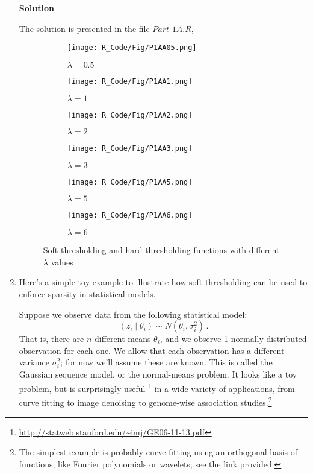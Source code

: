\documentclass[11 pt]{article}
\begin{document}
\begin{enumerate}[label=(\Alph*)]
\vspace{2mm}
\textbf{Solution}

The solution is presented in the file $Part\_1A.R$,



\begin{figure}[H]
	\begin{center}
		\begin{subfigure}[h]{0.4\linewidth}
			\texttt{[image: R\_Code/Fig/P1AA05.png]}
			\caption{$\lambda=0.5$}
		\end{subfigure}
		\begin{subfigure}[h]{0.4\linewidth}
			\texttt{[image: R\_Code/Fig/P1AA1.png]}
			\caption{$\lambda=1$}
		\end{subfigure}
		\begin{subfigure}[h]{0.4\linewidth}
			\texttt{[image: R\_Code/Fig/P1AA2.png]}
			\caption{$\lambda=2$}
		\end{subfigure}
		\begin{subfigure}[h]{0.4\linewidth}
			\texttt{[image: R\_Code/Fig/P1AA3.png]}
			\caption{$\lambda=3$}
		\end{subfigure}
		\begin{subfigure}[h]{0.4\linewidth}
			\texttt{[image: R\_Code/Fig/P1AA5.png]}
			\caption{$\lambda=5$}
		\end{subfigure}
		\begin{subfigure}[h]{0.4\linewidth}
			\texttt{[image: R\_Code/Fig/P1AA6.png]}
			\caption{$\lambda=6$}
		\end{subfigure}
		\caption{Soft-thresholding and hard-thresholding functions with different  $\lambda$ values}
		\label{fig:Fig1}
	\end{center}
\end{figure}



\newpage
\item Here's a simple toy example to illustrate how soft thresholding can be used to enforce sparsity in statistical models.

Suppose we observe data from the following statistical model:
$$
(z_{i} \mid \theta_i) \sim N(\theta_i, \sigma^2_i) \, .
$$
That is, there are $n$ different means $\theta_i$, and we observe 1 normally distributed observation for each one.  We allow that each observation has a different variance $\sigma^2_i$; for now we'll assume these are known.  This is called the Gaussian sequence model, or the normal-means problem.  It looks like a toy problem, but is surprisingly useful \footnote{\url{http://statweb.stanford.edu/~imj/GE06-11-13.pdf}} in a wide variety of applications, from curve fitting to image denoising to genome-wise association studies.\footnote{The simplest example is probably curve-fitting using an orthogonal basis of functions, like Fourier polynomials or wavelets; see the link provided.}


\end{enumerate}
\end{document}
